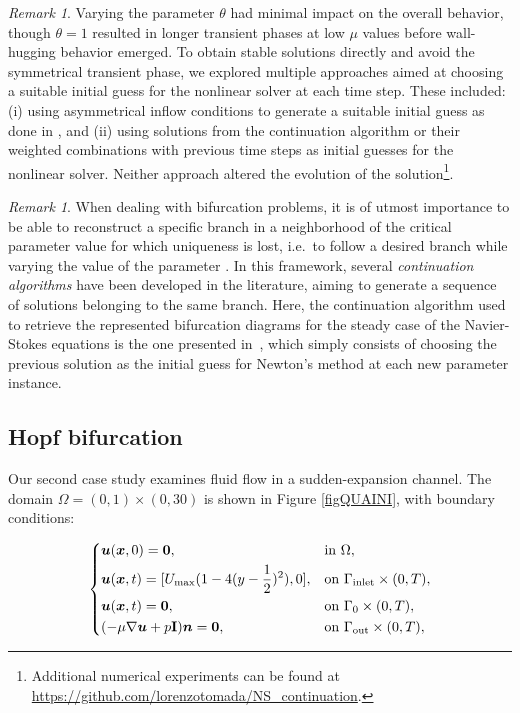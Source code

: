 \documentclass[reqno]{amsart}[standalone]
\theoremstyle{definition}
\theoremstyle{remark}
\newtheorem{remark}[definition]{Remark}
\newcommand{\bs}{\boldsymbol}
\begin{document}
\begin{remark}
Varying the parameter $\theta$ had minimal impact on the overall behavior, though $\theta = 1$ resulted in longer transient phases at low $\mu$ values before wall-hugging behavior emerged.
To obtain stable solutions directly and avoid the symmetrical transient phase, we explored multiple approaches aimed at choosing a suitable initial guess for the nonlinear solver at each time step. These included: (i) using asymmetrical inflow conditions to generate a suitable initial guess as done in \parencite{Hess_2019}, and (ii) using solutions from the continuation algorithm or their weighted combinations with previous time steps as initial guesses for the nonlinear solver.
Neither approach altered the evolution of the solution\footnote{
Additional numerical experiments can be found at
\href{https://github.com/lorenzotomada/NS_continuation}{https://github.com/lorenzotomada/NS\_continuation}.
%
}.
\end{remark}

\begin{remark}
When dealing with bifurcation problems, it is of utmost importance to be able to reconstruct a specific branch in a neighborhood of the critical parameter value for which uniqueness is lost, i.e.\ to follow a desired branch while varying the value of the parameter \parencite{TESIFP}.
In this framework, several \textit{continuation algorithms} \parencite{allgower_numerical_1990,KellerLecturesNumericalMethods1988,TESIFP} have been developed in the literature, aiming to generate a sequence of solutions belonging to the same branch.
Here, the continuation algorithm used to retrieve the represented bifurcation diagrams for the steady case of the Navier-Stokes equations is the one presented in~\parencite{TESIFP, Khamlich_2022}, which simply consists of choosing the previous solution as the initial guess for Newton's method at each new parameter instance. %

\end{remark} %
\subsection{Hopf bifurcation}\label{subsec:hopf_problem}
Our second case study examines fluid flow in a sudden-expansion channel.
The domain $\Omega = (0,1)\times(0,30)$ is shown in Figure \ref{figQUAINI}, with boundary conditions:

\begin{equation}\label{eq:bc_hopf}
    \begin{dcases}
    \bs{u}(\bs{x}, 0) = \bs{0}, &\text{in } \Omega, \\
    \bs{u}(\bs{x}, t) = [U_{\text{max}}(1 - 4(y - \frac{1}{2})^2), 0], &\text{on } \Gamma_{\text{inlet}}\times(0,T), \\
    \bs{u}(\bs{x}, t) = \bs{0}, &\text{on } \Gamma_0\times(0,T), \\
    (-\mu\nabla\bs{u} + p\mathbf{I})\bs{n} = \bs{0}, &\text{on } \Gamma_{\text{out}}\times(0,T),
    \end{dcases}
\end{equation}
\end{document}

